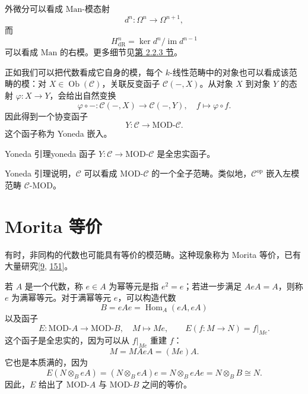 \begin{example}\label{ex:de-rham-module}
外微分可以看成 $\mathrm{Man}$-模态射
\[
  d^n\colon\Omega^n\to\Omega^{n+1},
\]
而
\[
  H^n_{\mathrm{dR}}=\ker d^n/\operatorname{im}d^{n-1}
\]
可以看成 $\mathrm{Man}$ 的右模。更多细节见\hyperref[subsec:de-rham-cohomology]{第 2.2.3 节}。
\end{example}

正如我们可以把代数看成它自身的模，每个 $k$-线性范畴中的对象也可以看成该范畴的模：对 $X\in\operatorname{Ob}(\mathcal C)$，关联反变函子 $\mathcal C(-,X)$。从对象 $X$ 到对象 $Y$ 的态射 $\varphi\colon X\to Y$，会给出自然变换
\[
  \varphi\circ-\colon\mathcal C(-,X)\to\mathcal C(-,Y),\quad
  f\longmapsto\varphi\circ f.
\]
因此得到一个协变函子
\[
  Y\colon\mathcal C\to\mathrm{MOD}\text{-}\mathcal C.
\]
这个函子称为 Yoneda 嵌入。

\begin{lemma}{Yoneda 引理}{yoneda}
函子 $Y\colon\mathcal C\to\mathrm{MOD}\text{-}\mathcal C$ 是全忠实函子。
\end{lemma}

Yoneda 引理说明，$\mathcal C$ 可以看成 $\mathrm{MOD}\text{-}\mathcal C$ 的一个全子范畴。类似地，$\mathcal C^{\mathrm{op}}$ 嵌入左模范畴 $\mathcal C\text{-}\mathrm{MOD}$。

\section{Morita 等价}\label{sec:morita-equivalence}
有时，非同构的代数也可能具有等价的模范畴。这种现象称为 Morita 等价，已有大量研究[\hyperlink{ref:9}{9}, \hyperlink{ref:151}{151}]。

\begin{example}\label{ex:full-idempotent}
若 $A$ 是一个代数，称 $e\in A$ 为幂等元是指 $e^2=e$；若进一步满足 $AeA=A$，则称 $e$ 为满幂等元。对于满幂等元 $e$，可以构造代数
\[
  B=eAe=\operatorname{Hom}_A(eA,eA)
\]
以及函子
\[
  E\colon\mathrm{MOD}\text{-}A\to\mathrm{MOD}\text{-}B,\quad
  M\longmapsto Me,\qquad
  E(f\colon M\to N)=f|_{Me}.
\]
这个函子是全忠实的，因为可以从 $f|_{Me}$ 重建 $f$：
\[
  M=MAeA=(Me)A.
\]
它也是本质满的，因为
\[
  E(N\otimes_B eA)
  =(N\otimes_B eA)e
  =N\otimes_B eAe
  =N\otimes_B B
  \cong N.
\]
因此，$E$ 给出了 $\mathrm{MOD}\text{-}A$ 与 $\mathrm{MOD}\text{-}B$ 之间的等价。
\end{example}

